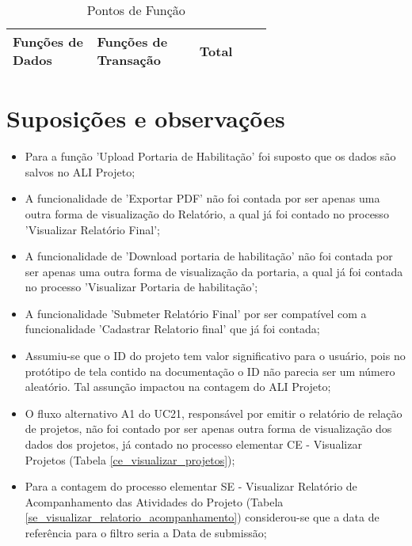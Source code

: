 \begin{table*}[!h]
\centering
\caption{Pontos de Função}
\label{resultado_contagem}
  \begin{tabular}{|p{0.20\linewidth}|p{0.25\linewidth}|p{0.20\linewidth}|}
  \hline
  \textbf{Funções de Dados} & \textbf{Funções de Transação} & \textbf{Total} \\ 
  \hline
 
  \end{tabular}
\end{table*}

\vfill
\pagebreak
\section{Suposições e observações}

  \begin{itemize}
   \item Para a função 'Upload Portaria de Habilitação' foi suposto que os dados são salvos no ALI Projeto;
   
   \item A funcionalidade de 'Exportar PDF' não foi contada por ser apenas uma outra forma de visualização do Relatório, a qual já foi contado
   no processo 'Visualizar Relatório Final';
   
   \item A funcionalidade de 'Download portaria de habilitação' não foi contada por ser apenas uma outra forma de visualização da portaria, a qual
   já foi contada no processo 'Visualizar Portaria de habilitação';
   
   \item A funcionalidade 'Submeter Relatório Final' por ser compatível com a funcionalidade 'Cadastrar Relatorio final'
   que já foi contada;
   
   \item Assumiu-se que o ID do projeto tem valor significativo para o usuário, pois no protótipo de tela contido na documentação o ID não 
    parecia ser um número aleatório. Tal assunção impactou na contagem do ALI Projeto;
   
   \item O fluxo alternativo A1 do UC21, responsável por emitir o relatório de relação de projetos, não foi contado por ser apenas outra forma
    de visualização dos dados dos projetos, já contado no processo elementar CE - Visualizar Projetos (Tabela \ref{ce_visualizar_projetos});
   
   \item Para a contagem do processo elementar SE - Visualizar Relatório de Acompanhamento das Atividades do Projeto
    (Tabela \ref{se_visualizar_relatorio_acompanhamento}) considerou-se que a data de referência para o filtro seria a Data de submissão;
    

\end{itemize}
